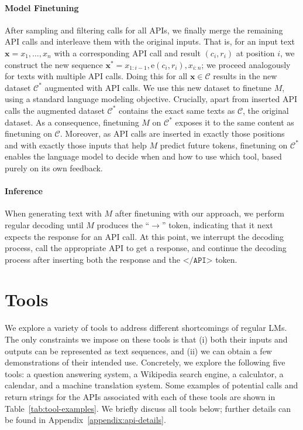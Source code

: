 \documentclass[11pt]{article}
\begin{document}
\begin{CJK*}{UTF8}{gbsn}
\paragraph{Model Finetuning} After sampling and filtering calls for all APIs, we finally merge the remaining API calls and interleave them with the original inputs. That is, for an input text $\mathbf{x} = x_1, \ldots, x_n$ with a corresponding API call and result $(c_i, r_i)$ at position $i$, we construct the new sequence $\mathbf{x}^* = x_{1:{i-1}}, \text{e}(c_i, r_i), x_{i:n}$; we proceed analogously for texts with multiple API calls. Doing this for all $\mathbf{x} \in \mathcal{C}$ results in the new dataset $\mathcal{C}^*$ augmented with API calls. We use this new dataset to finetune $M$, using a standard language modeling objective. Crucially,  apart from inserted API calls the augmented dataset $\mathcal{C}^*$ contains the exact same texts as $\mathcal{C}$, the original dataset. As a consequence, finetuning $M$ on $\mathcal{C}^*$ exposes it to the same content as finetuning on $\mathcal{C}$. Moreover, as API calls are inserted in exactly those positions and with exactly those inputs that help $M$ predict future tokens, finetuning on $\mathcal{C}^*$ enables the language model to decide when and how to use which tool, based purely on its own feedback.

\paragraph{Inference} When generating text with $M$ after finetuning with our approach, we perform regular decoding until $M$ produces the ``$\rightarrow$'' token, indicating that it next expects the response for an API call. At this point, we interrupt the decoding process, call the appropriate API to get a response, and continue the decoding process after inserting both the response and the $\texttt{</API>}$ token.

\section{Tools}

We explore a variety of tools to address different shortcomings of regular LMs. The only constraints we impose on these tools is that (i) both their inputs and outputs can be represented as text sequences, and (ii) we can obtain a few demonstrations of their intended use. Concretely, we explore the following five tools: a question answering system, a Wikipedia search engine, a calculator, a calendar, and a machine translation system. Some examples of potential calls and return strings for the APIs associated with each of these tools are shown in Table~\ref{tab:tool-examples}. We briefly discuss all tools below; further details can be found in Appendix~\ref{appendix:api-details}.


\end{CJK*}
\end{document}
